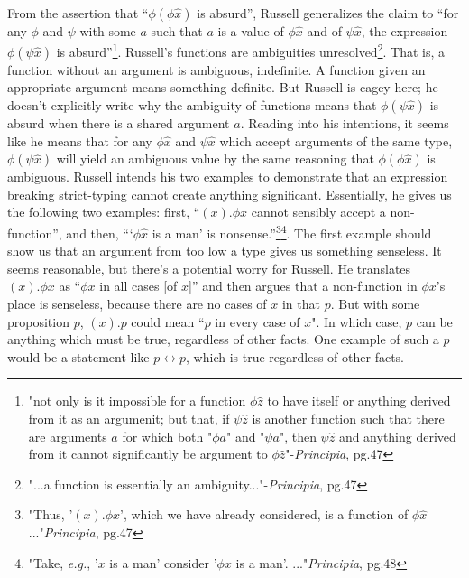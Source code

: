 \documentclass{article}
\begin{document}
\paragraph{}
From the assertion that “$\phi(\phi\hat x)$ is absurd”, Russell generalizes the claim to “for any $\phi$ and $\psi$ with some $a$ such that $a$ is a value of $\phi\hat x$ and of $\psi\hat x$, the expression $\phi(\psi\hat x)$ is absurd”\footnote[5]{"not only is it impossible for a function $\phi\hat z$ to have itself or anything derived from it as an argumenit; but that, if $\psi\hat z$ is another function such that there are arguments $a$ for which both "$\phi a$" and "$\psi a$", then $\psi\hat z$ and anything derived from it cannot significantly be argument to $\phi\hat z$"-\textit{Principia}, pg.47}.
Russell's functions are ambiguities unresolved\footnote[6]{"...a function is essentially an ambiguity..."-\textit{Principia}, pg.47}. That is, a function without an argument is ambiguous, indefinite. A function given an appropriate argument means something definite.
But Russell is cagey here; he doesn’t explicitly write why the ambiguity of functions means that $\phi(\psi\hat x)$ is absurd when there is a shared argument $a$. Reading into his intentions, it seems like he means that for any $\phi\hat x$ and $\psi\hat x$ which accept arguments of the same type, $\phi(\psi\hat x)$ will yield an ambiguous value by the same reasoning that $\phi(\phi\hat x)$ is ambiguous.
Russell intends his two examples to demonstrate that an expression breaking strict-typing cannot create anything significant. Essentially, he gives us the following two examples: first, “$(x).\phi x$ cannot sensibly accept a non-function”, and then, “‘$\phi\hat x$ is a man’ is nonsense.”\footnote[8]{"Thus, '$(x).\phi x$', which we have already considered, is a function of $\phi\hat x$..."\textit{Principia}, pg.47}\footnote[9]{"Take, \textit{e.g.}, '$x$ is a man' consider '$\phi x$ is a man'. ..."\textit{Principia}, pg.48}.
The first example should show us that an argument from too low a type gives us something senseless.
It seems reasonable, but there’s a potential worry for Russell. He translates $(x).\phi x$ as “$\phi x$ in all cases [of $x$]” and then argues that a non-function in $\phi x$’s place is senseless, because there are no cases of $x$ in that $p$. But with some proposition $p$, $(x).p$ could mean “$p$ in every case of $x$". In which case, $p$ can be anything which must be true, regardless of other facts. One example of such a $p$ would be a statement like $p\leftrightarrow p$, which is true regardless of other facts.
\end{document}
